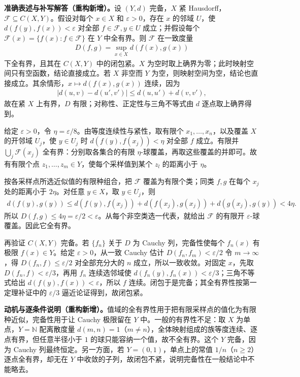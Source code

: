 \documentclass[../../main.tex]{subfiles}%
\begin{document}
\begin{solution}
\textbf{准确表述与补写解答（重构新增）。}设 $(Y,d)$ 完备，$X$ 紧 Hausdorff，$\mathcal F\subseteq C(X,Y)$。假设对每个 $x\in X$ 和 $\varepsilon>0$，存在 $x$ 的邻域 $U$，使 $d(f(y),f(x))<\varepsilon$ 对全部 $f\in\mathcal F,y\in U$ 成立；并假设每个 $\mathcal F(x)=\{f(x):f\in\mathcal F\}$ 在 $Y$ 中全有界。则 $\mathcal F$ 在一致度量
\begin{align*}
D(f,g)=\sup_{x\in X}d(f(x),g(x))
\end{align*}
下全有界，且其在 $C(X,Y)$ 中的闭包紧。$X$ 为空时取上确界为零；此时映射空间只有空函数，结论直接成立。若 $X$ 非空而 $Y$ 为空，则映射空间为空，结论也直接成立。其余情形，$x\mapsto d(f(x),g(x))$ 连续，因为
\begin{align*}
|d(u,v)-d(u',v')|\le d(u,u')+d(v,v'),
\end{align*}
故在紧 $X$ 上有界，$D$ 有限；对称性、正定性与三角不等式由 $d$ 逐点取上确界得到。

给定 $\varepsilon>0$，令 $\eta=\varepsilon/8$。由等度连续性与紧性，取有限个 $x_1,\ldots,x_n$，以及覆盖 $X$ 的开邻域 $U_j$，使 $y\in U_j$ 时 $d(f(y),f(x_j))<\eta$ 对全部 $f$ 成立。有限并 $\bigcup_j\mathcal F(x_j)$ 全有界：分别取各集合的有限 $\eta$-球覆盖，再取这些覆盖的并即可。故有有限个点 $z_1,\ldots,z_m\in Y$，使每个采样值到某个 $z_l$ 的距离小于 $\eta$。

按各采样点所选近似值的有限种组合，把 $\mathcal F$ 覆盖为有限个类；同类 $f,g$ 在每个 $x_j$ 处的距离小于 $2\eta$。对任意 $y\in X$，取 $y\in U_j$，则
\begin{align*}
d(f(y),g(y))
\le d(f(y),f(x_j))+d(f(x_j),g(x_j))+d(g(x_j),g(y))<4\eta.
\end{align*}
所以 $D(f,g)\le4\eta=\varepsilon/2<\varepsilon$。从每个非空类选一代表，就给出 $\mathcal F$ 的有限开 $\varepsilon$-球覆盖。因此它全有界。

再验证 $C(X,Y)$ 完备。若 $\{f_n\}$ 关于 $D$ 为 Cauchy 列，完备性使每个 $f_n(x)$ 有极限 $f(x)\in Y$。给定 $\varepsilon>0$，从一致 Cauchy 估计 $D(f_n,f_m)<\varepsilon/2$ 令 $m\to\infty$，得 $D(f_n,f)\le\varepsilon/2$ 对全部充分大的 $n$ 成立，所以一致收敛。对固定 $x$，先取 $D(f_n,f)<\varepsilon/3$，再用 $f_n$ 连续选邻域使 $d(f_n(y),f_n(x))<\varepsilon/3$；三角不等式给出 $d(f(y),f(x))<\varepsilon$，所以 $f$ 连续。闭包于是完备；其全有界性按第一定理补证中的 $\varepsilon/3$ 逼近论证得到，故闭包紧。
\end{solution}
\begin{remark}
\textbf{动机与逐条件说明（重构新增）。}值域的全有界性用于把有限采样点的值化为有限种近似，完备性用于让 Cauchy 极限留在 $Y$ 中。一般的有界性不足：取 $X$ 为单点，$Y=\mathbb N$ 配离散度量 $d(m,n)=1$（$m\ne n$），全体映射组成的族等度连续、逐点有界，但任意半径小于 $1$ 的球只能容纳一个值，故不全有界。这个 $Y$ 完备，因为 Cauchy 列最终恒定。另一方面，若 $Y=(0,1)$，单点上的常值 $1/n$（$n\ge2$）逐点全有界，却无在 $Y$ 中收敛的子列，故闭包不紧，说明完备性在一般结论中不能略去。
\end{remark}
\end{document}
